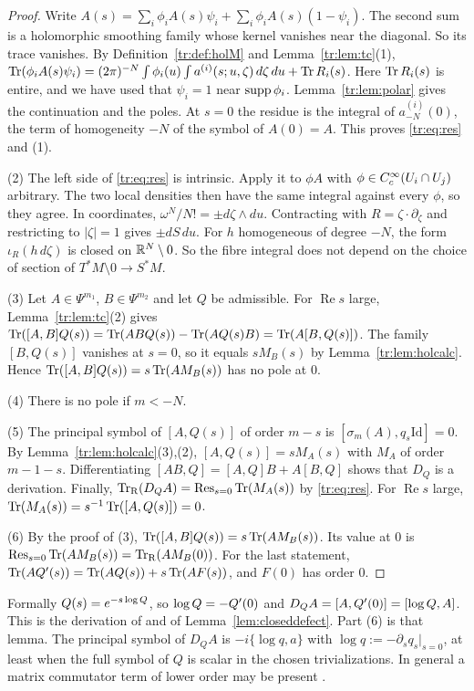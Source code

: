 \begin{proof}
Write \(A(s)=\sum_i\phi_iA(s)\psi_i+\sum_i\phi_iA(s)(1-\psi_i)\). The second
sum is a holomorphic smoothing family whose kernel vanishes near the
diagonal. So its trace vanishes. By Definition~\ref{tr:def:holM} and
Lemma~\ref{tr:lem:tc}(1),
\(\operatorname{Tr}(\phi_iA(s)\psi_i)=(2\pi)^{-N}\int\phi_i(u)\int a^{(i)}(s;u,\zeta)\,
d\zeta\,du+\operatorname{Tr} R_i(s)\). Here \(\operatorname{Tr} R_i(s)\) is entire, and we have used
that \(\psi_i=1\) near \(\operatorname{supp}\phi_i\). Lemma~\ref{tr:lem:polar} gives the
continuation and the poles. At \(s=0\) the residue is the integral of
\(a^{(i)}_{-N}(0)\), the term of homogeneity \(-N\) of the symbol of
\(A(0)=A\). This proves \eqref{tr:eq:res} and (1).

(2) The left side of \eqref{tr:eq:res} is intrinsic. Apply it to \(\phi A\)
with \(\phi\in C^\infty_c(U_i\cap U_j)\) arbitrary. The two local densities then
have the same integral against every \(\phi\), so they agree. In
coordinates, \(\omega^N/N!=\pm d\zeta\wedge du\). Contracting with
\(R=\zeta\cdot\partial_\zeta\) and restricting to \(|\zeta|=1\) gives
\(\pm dS\,du\). For \(h\) homogeneous of degree \(-N\), the form
\(\iota_R(h\,d\zeta)\) is closed on \(\mathbb R^N\setminus0\). So the fibre integral
does not depend on the choice of section of \(T^*M\setminus0\to S^*M\).

(3) Let \(A\in\Psi^{m_1}\), \(B\in\Psi^{m_2}\) and let \(Q\) be admissible. For
\(\operatorname{Re}s\) large, Lemma~\ref{tr:lem:tc}(2) gives
\(\operatorname{Tr}([A,B]Q(s))=\operatorname{Tr}(ABQ(s))-\operatorname{Tr}(AQ(s)B)=\operatorname{Tr}(A[B,Q(s)])\). The family
\([B,Q(s)]\) vanishes at \(s=0\), so it equals \(sM_B(s)\) by
Lemma~\ref{tr:lem:holcalc}. Hence \(\operatorname{Tr}([A,B]Q(s))=s\operatorname{Tr}(AM_B(s))\) has no
pole at \(0\).

(4) There is no pole if \(m<-N\).

(5) The principal symbol of \([A,Q(s)]\) of order \(m-s\) is
\([\sigma_m(A),q_s\mathrm{Id}]=0\). By Lemma~\ref{tr:lem:holcalc}(3),(2),
\([A,Q(s)]=sM_A(s)\) with \(M_A\) of order \(m-1-s\). Differentiating
\([AB,Q]=[A,Q]B+A[B,Q]\) shows that \(D_Q\) is a derivation. Finally,
\(\operatorname{Tr}_{\mathrm R}(D_QA)=\operatorname{Res}_{s=0}\operatorname{Tr}(M_A(s))\) by \eqref{tr:eq:res}. For
\(\operatorname{Re}s\) large, \(\operatorname{Tr}(M_A(s))=s^{-1}\operatorname{Tr}([A,Q(s)])=0\).

(6) By the proof of (3), \(\operatorname{Tr}([A,B]Q(s))=s\operatorname{Tr}(AM_B(s))\). Its value at
\(0\) is \(\operatorname{Res}_{s=0}\operatorname{Tr}(AM_B(s))=\operatorname{Tr}_{\mathrm R}(AM_B(0))\). For the last statement,
\(\operatorname{Tr}(AQ'(s))=\operatorname{Tr}(AQ(s))+s\operatorname{Tr}(AF(s))\), and \(F(0)\) has order \(0\).
\end{proof}

Formally \(Q(s)=e^{-s\log Q}\), so \(\log Q=-Q'(0)\) and \(D_QA=[A,Q'(0)]=
[\log Q,A]\). This is the derivation of \cite[\S6]{MN} and of
Lemma~\ref{lem:closeddefect}. Part (6) is that lemma. The principal symbol
of \(D_QA\) is \(-i\{\log q,a\}\) with
\(\log q:=-\partial_sq_s|_{s=0}\), at least when the full symbol of \(Q\)
is scalar in the chosen trivializations. In general a matrix commutator
term of lower order may be present \cite[Ch.~15]{MelroseMicro}.

